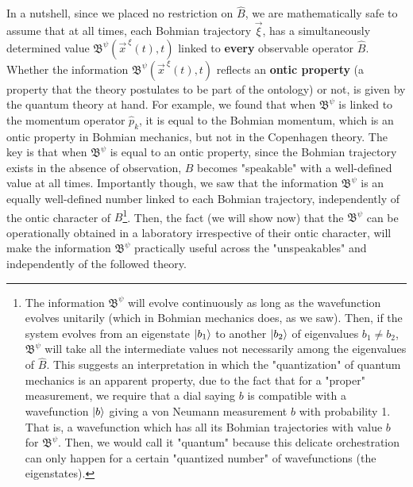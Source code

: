 \documentclass[11pt, a4paper]{article} %
\newcommand{\B}{\mathfrak{B}}
\begin{document}
In a nutshell, since we placed no restriction on $\hat{B}$, we are mathematically safe to assume that at all times, each Bohmian trajectory $\vec{\xi}$, has a simultaneously determined value $\B^\psi(\vec{x}^{\:\xi}(t),t)$ linked to {\bf every} observable operator $\hat{B}$. Whether the information $\B^\psi(\vec{x}^{\:\xi}(t),t)$ reflects an \textbf{ontic property} (a property that the theory postulates to be part of the ontology) or not, is given by the quantum theory at hand. For example, we found that when $\B^\psi$ is linked to the momentum operator $\hat{p}_k$, it is equal to the Bohmian momentum, which is an ontic property in Bohmian mechanics, but not in the Copenhagen theory. The key is that when $\B^\psi$ is equal to an ontic property, since the Bohmian trajectory exists in the absence of observation, $B$ becomes "speakable" with a well-defined value at all times. Importantly though, we saw that the information $\B^\psi$ is an equally well-defined number linked to each Bohmian trajectory, independently of the ontic character of $B$\footnote{The information $\B^\psi$ will evolve continuously as long as the wavefunction evolves unitarily (which in Bohmian mechanics does, as we saw). Then, if the system evolves from an eigenstate $\ket{b_1}$ to another $\ket{b_2}$ of eigenvalues $b_1\neq b_2$, $\B^\psi$ will take all the intermediate values not necessarily among the eigenvalues of $\hat{B}$. This suggests an interpretation in which the "quantization" of quantum mechanics is an apparent property, due to the fact that for a "proper" measurement, we require that a dial saying $b$ is compatible with a wavefunction $\ket{b}$ giving a von Neumann measurement $b$ with probability 1. That is, a wavefunction which has all its Bohmian trajectories with value $b$ for $\B^\psi$. Then, we would call it "quantum" because this delicate orchestration can only happen for a certain "quantized number" of wavefunctions (the eigenstates).}. Then, the fact (we will show now) that the $\B^\psi$ can be operationally obtained in a laboratory irrespective of their ontic character, will make the information $\B^\psi$ practically useful across the "unspeakables" and independently of the followed theory.
\vspace{-0.75cm}
 
\end{document}
